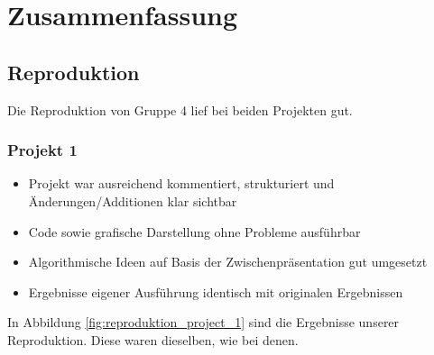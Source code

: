 \chapter{Zusammenfassung}
\label{chapter:kap5}

\section{Reproduktion}
    Die Reproduktion von Gruppe 4 lief bei beiden Projekten gut. 
    
    \subsection{Projekt 1}
        \begin{itemize}
            \item Projekt war ausreichend kommentiert, strukturiert und Änderungen/Additionen klar sichtbar
            \item Code sowie grafische Darstellung ohne Probleme ausführbar
            \item Algorithmische Ideen auf Basis der Zwischenpräsentation gut umgesetzt
            \item Ergebnisse eigener Ausführung identisch mit originalen Ergebnissen
        \end{itemize}

        In Abbildung \ref{fig:reproduktion_project_1} sind die Ergebnisse unserer Reproduktion. Diese waren dieselben, wie bei denen.

